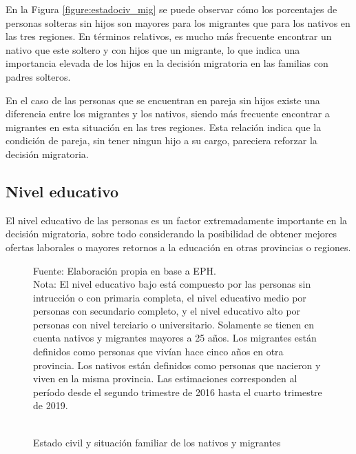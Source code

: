 \documentclass[12pt,a4paper]{article}
\begin{document}
En la Figura \ref{figure:estadociv_mig} se puede observar cómo los porcentajes de personas solteras sin hijos son mayores para los migrantes que para los nativos en las tres regiones. En términos relativos, es mucho más frecuente encontrar un nativo que este soltero y con hijos que un migrante, lo que indica una importancia elevada de los hijos en la decisión migratoria en las familias con padres solteros.

En el caso de las personas que se encuentran en pareja sin hijos existe una diferencia entre los migrantes y los nativos, siendo más frecuente encontrar a migrantes en esta situación en las tres regiones. Esta relación indica que la condición de pareja, sin tener ningun hijo a su cargo, pareciera reforzar la decisión migratoria.

\subsection{Nivel educativo}

El nivel educativo de las personas es un factor extremadamente importante en la decisión migratoria, sobre todo considerando la posibilidad de obtener mejores ofertas laborales o mayores retornos a la educación  en otras provincias o regiones.

\begin{figure}[htbp!]
\begin{center}
\caption{\\Estado civil y situación familiar de los nativos y migrantes}
\label{figure:niveled_mig}
 
\end{center}
\begin{flushleft}
\begin{scriptsize}
Fuente: Elaboración propia en base a EPH.\\
Nota: El nivel educativo bajo está compuesto por las personas sin intrucción o con primaria completa, el nivel educativo medio por personas con secundario completo, y el nivel educativo alto por personas con nivel terciario o universitario. Solamente se tienen en cuenta nativos y migrantes mayores a 25 años. Los migrantes están definidos como personas que vivían hace cinco años en otra provincia. Los nativos están definidos como personas que nacieron y viven en la misma provincia. Las estimaciones corresponden al período desde el segundo trimestre de 2016 hasta el cuarto trimestre de 2019.\\
\end{scriptsize}
\end{flushleft}
\end{figure}
\end{document}
